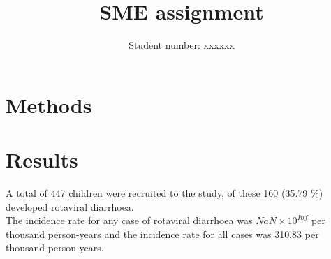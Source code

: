 \documentclass[11pt,a4paper,twoside]{article}\usepackage{graphicx, color}
\title{SME assignment}
\author{Student number: xxxxxx}
\makeatletter
\newenvironment{kframe}{%
 \def\at@end@of@kframe{}%
 \ifinner\ifhmode%
  \def\at@end@of@kframe{\end{minipage}}%
  \begin{minipage}{\columnwidth}%
 \fi\fi%
 \def\FrameCommand##1{\hskip\@totalleftmargin \hskip-\fboxsep
 \colorbox{shadecolor}{##1}\hskip-\fboxsep
     \hskip-\linewidth \hskip-\@totalleftmargin \hskip\columnwidth}%
 \MakeFramed {\advance\hsize-\width
   \@totalleftmargin\z@ \linewidth\hsize
   \@setminipage}}%
 {\par\unskip\endMakeFramed%
 \at@end@of@kframe}
\makeatother
\begin{document}
\section{Methods}
\begin{kframe}


{\ttfamily\noindent\color{warningcolor}{\#\# Warning: package 'foreign' was built under R version 2.15.3}}\end{kframe}


\section{Results}
A total of 447 children were recruited to the study, of these 160 (35.79 \%) developed rotaviral diarrhoea. \\
The incidence rate for any case of rotaviral diarrhoea was \ensuremath{NaN\times 10^{Inf}} per thousand person-years and the incidence rate for all cases was 310.83 per thousand person-years.\\ 
\end{document}
